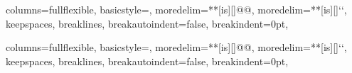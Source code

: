 \newcommand\hlunderlinestyle[5][black]{%
    \draw [ yshift = -0.4\baselineskip, #1 ] (#2, #3) -- (#4, #5);
}

\newcommand\hlmarkerstyle[5][yellow]{%
    \draw [ line width = \baselineskip, #1 ] (#2, #3) -- (#4, #5);
}

\newcommand\hlboxstyle[5][red]{%
    \draw let \p1 = (#2, #3), \p2 = (#4, #5)
          in node [ draw = #1,
                    fill = #1!10!white,
                    minimum height = \baselineskip,
                    fit = (\p1)(\p2),
                    anchor = west,
                    align = none,  %
                    outer sep = 0pt, inner sep = 0pt ]
             at (\p1) {};
}

\let\hldefaultstyle=\hlmarkerstyle

\makeatother


\newcommand\delimstyleA{\hlstyle[{\hlboxstyle[green]}]}
\newcommand\delimstyleB{\hlstyle[{\hlboxstyle[green!20, draw=green]}]}
\newcommand\delimstyleBsm{\hlstyle[{\small\hlboxstyle[green!20, draw=green]}]}
\newcommand\delimstyleBft{\hlstyle[{\footnotesize\hlboxstyle[green!20, draw=green]}]}
\newcommand\delimstyleC{\hlstyle[{\hlunderlinestyle[red, line width = 0.8pt]}]}

{
    columns=fullflexible,
    basicstyle={\ttfamily \small},
    moredelim=**[is][\delimstyleA]{@}{@},
    moredelim=**[is][\delimstyleBsm]{`}{`},
    keepspaces,
    breaklines,
    breakautoindent=false,
    breakindent=0pt,
}

{
    columns=fullflexible,
    basicstyle={\sffamily \footnotesize},
    moredelim=**[is][\delimstyleA]{@}{@},
    moredelim=**[is][\delimstyleBft]{`}{`},
    keepspaces,
    breaklines,
    breakautoindent=false,
    breakindent=0pt,
}